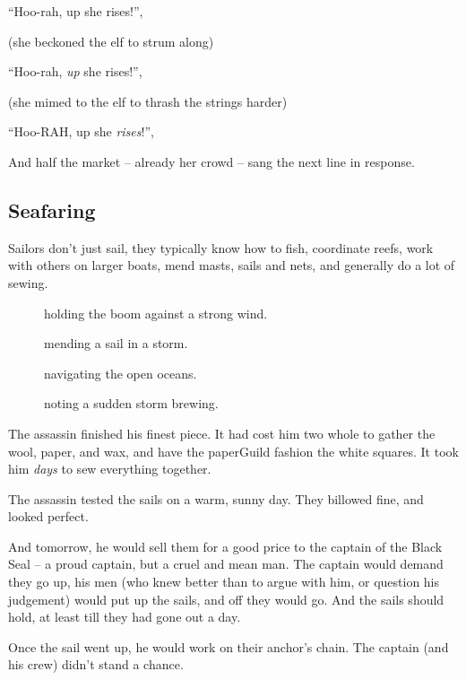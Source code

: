 \begin{multicols}{2}
\begin{exampletext}
  ``Hoo-rah, up she rises!'',

  (she beckoned the elf to strum along)

  ``Hoo-rah, \emph{up} she rises!'',

  (she mimed to the elf to thrash the strings harder)

  ``Hoo-RAH, up she \emph{rises}!'',

  And half the market -- already her crowd -- sang the next line in response.

\end{exampletext}

\subsection{Seafaring}

Sailors don't just sail, they typically know how to fish, coordinate reefs, work with others on larger boats, mend masts, sails and nets, and generally do a lot of sewing.

\begin{description}
  \item[]
    holding the boom against a strong wind.
  \item[]
    mending a sail in a storm.
  \item[]
    navigating the open oceans.
  \item[]
    noting a sudden storm brewing.
\end{description}

\begin{exampletext}
  The assassin finished his finest piece.
  It had cost him two whole  to gather the wool, paper, and wax, and have the \gls{paperGuild} fashion the white squares.
  It took him \emph{days} to sew everything together.

  The assassin tested the sails on a warm, sunny day.
  They billowed fine, and looked perfect.

  And tomorrow, he would sell them for a good price to the captain of the Black Seal -- a proud captain, but a cruel and mean man.
  The captain would demand they go up, his men (who knew better than to argue with him, or question his judgement) would put up the sails, and off they would go.
  And the sails should hold, at least till they had gone out a day.

  Once the sail went up, he would work on their anchor's chain.
  The captain (and his crew) didn't stand a chance.


\end{exampletext}
\end{multicols}
